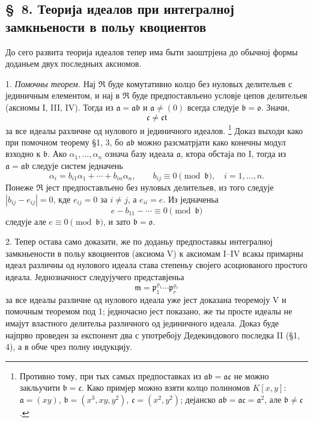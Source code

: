 \documentclass[11pt]{article}
\providecommand{\mR}{\mathfrak{R}}
\providecommand{\ma}{\mathfrak{a}}
\providecommand{\mb}{\mathfrak{b}}
\providecommand{\mc}{\mathfrak{c}}
\providecommand{\mm}{\mathfrak{m}}
\providecommand{\mo}{\mathfrak{o}}
\providecommand{\mt}{\mathfrak{t}}
\providecommand{\mpideal}{\mathfrak{p}}
\begin{document}
\setcounter{footnote}{29}

\subsection*{\S~8. Теорија идеалов при интегралној замкньености в польу квоциентов}

До сего развита теорија идеалов тепер има быти заоштрјена до обычној формы доданьем двух последньих аксиомов.

1. \emph{Помочны теорем.} Нај $\mR$ буде комутативно колцо без нуловых делительев с јединичным елементом, и нај в $\mR$ буде предпоставльено условје цепов делительев (аксиомы I, III, IV). Тогда из $\ma=\ma\mb$ и $\ma\ne(0)$ всегда следује $\mb=\mo$. Значи,
\[
        \mc\ne\mc\mt
\]
за все идеалы различне од нулового и јединичного идеалов.
\footnote{Противно тому, при тых самых предпоставках из $\ma\mb=\ma\mc$ не можно закльучити $\mb=\mc$. Како примјер можно взяти колцо полиномов $K[x,y]$: $\ma=(xy)$, $\mb=(x^3,xy,y^2)$, $\mc=(x^2,y^2)$; дејанско $\ma\mb=\ma\mc=\ma^2$, але $\mb\ne\mc$.}
Доказ выходи како при помочном теорему §1, 3, бо $\ma\mb$ можно разсматрјати како конечны модул взходно к $\mb$. Ако $\alpha_1,\ldots,\alpha_n$ означа базу идеала $\ma$, ктора обстаја по I, тогда из $\ma=\ma\mb$ следује систем једначень
\[
        \alpha_i=b_{i1}\alpha_1+\cdots+b_{in}\alpha_n,
        \qquad b_{ij}\equiv0\pmod{\mb},\quad i=1,\ldots,n.
\]
Понеже $\mR$ јест предпоставльено без нуловых делительев, из того следује $|b_{ij}-e_{ij}|=0$, кде $e_{ij}=0$ за $i\ne j$, а $e_{ii}=e$. Из једначеньа
\[
        e-b_{11}-\cdots\equiv0\pmod{\mb}
\]
следује але $e\equiv0\pmod{\mb}$, и зато $\mb=\mo$.

2. Тепер остава само доказати, же по доданьу предпоставкы интегралној замкньености в польу квоциентов (аксиома V) к аксиомам I--IV всакы примарны идеал различны од нулового идеала става степеньу својего асоциованого простого идеала. Једнозначност следујучего представјеньа
\[
        \mm=\mpideal_1^{\varrho_1}\cdots\mpideal_r^{\varrho_r}
\]
за все идеалы различне од нулового идеала уже јест доказана теоремоју V и помочным теоремом под 1; једночасно јест показано, же ты просте идеалы не имајут властного делительа различного од јединичного идеала. Доказ буде најпрво проведен за експонент два с употребоју Дедекиндового последка II (§1, 4), а в обче чрез полну индукцију.
\end{document}
